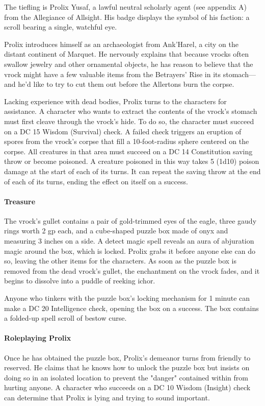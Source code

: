 \documentclass[10pt,a4paper,twoside,bg=print,twocolumn,openany,nodeprecatedcode]{dndbook}
\begin{document}
The tiefling is Prolix Yusaf, a lawful neutral scholarly agent (see appendix A) from the Allegiance of Allsight. His badge displays the symbol of his faction: a scroll bearing a single, watchful eye.


Prolix introduces himself as an archaeologist from Ank'Harel, a city on the distant continent of Marquet. He nervously explains that because vrocks often swallow jewelry and other ornamental objects, he has reason to believe that the vrock might have a few valuable items from the Betrayers' Rise in its stomach—and he'd like to try to cut them out before the Allertons burn the corpse.

Lacking experience with dead bodies, Prolix turns to the characters for assistance. A character who wants to extract the contents of the vrock's stomach must first cleave through the vrock's hide. To do so, the character must succeed on a DC 15 Wisdom (Survival) check. A failed check triggers an eruption of spores from the vrock's corpse that fill a 10-foot-radius sphere centered on the corpse. All creatures in that area must succeed on a DC 14 Constitution saving throw or become poisoned. A creature poisoned in this way takes 5 (1d10) poison damage at the start of each of its turns. It can repeat the saving throw at the end of each of its turns, ending the effect on itself on a success.

\paragraph{Treasure}
The vrock's gullet contains a pair of gold-trimmed eyes of the eagle, three gaudy rings worth 2 gp each, and a cube-shaped puzzle box made of onyx and measuring 3 inches on a side. A detect magic spell reveals an aura of abjuration magic around the box, which is locked. Prolix grabs it before anyone else can do so, leaving the other items for the characters. As soon as the puzzle box is removed from the dead vrock's gullet, the enchantment on the vrock fades, and it begins to dissolve into a puddle of reeking ichor.

Anyone who tinkers with the puzzle box's locking mechanism for 1 minute can make a DC 20 Intelligence check, opening the box on a success. The box contains a folded-up spell scroll of bestow curse.

\paragraph{Roleplaying Prolix}
Once he has obtained the puzzle box, Prolix's demeanor turns from friendly to reserved. He claims that he knows how to unlock the puzzle box but insists on doing so in an isolated location to prevent the "danger" contained within from hurting anyone. A character who succeeds on a DC 10 Wisdom (Insight) check can determine that Prolix is lying and trying to sound important.
\end{document}
